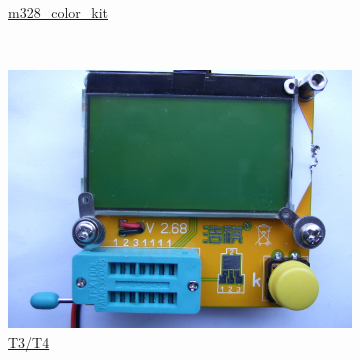 \documentclass[pdftex,12pt,a4paper,english]{article}
\begin{document}
\begin{figure}[H]
\begin{subfigure}[b]{.3\textwidth}
	  {\href{run:./trunk/mega328_color_kit/}{m328\_color\_kit}}
  \end{subfigure}
~
  \begin{subfigure}[b]{.3\textwidth}	%
    \centering
    \includegraphics[width=1.\textwidth]{../PNG/T3_Front.JPG}
	  \\ \vspace{-0.5em}
	  {\href{run:./trunk/mega328_T3_T4_st7565/}{T3/T4}}
  \end{subfigure}
\end{figure}
\vspace{-1em}
\end{document}
